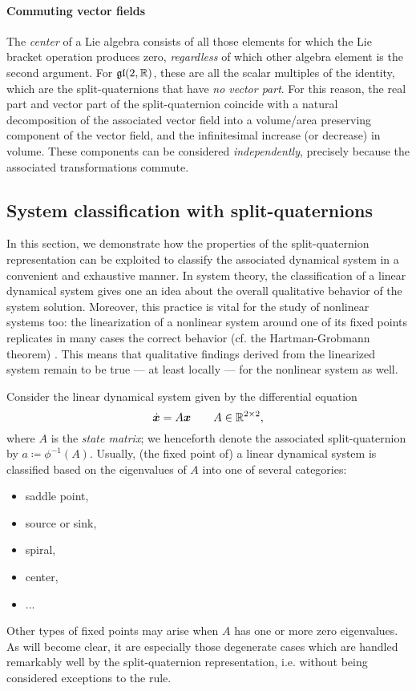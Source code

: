 \paragraph{Commuting vector fields}
The \emph{center} of a Lie algebra consists of all those elements for which the Lie bracket operation produces zero, \emph{regardless} of which other algebra element is the second argument. For $\mathfrak{gl}(2, \mathbb{R})$, these are all the scalar multiples of the identity, which are the split-quaternions that have \emph{no vector part}. For this reason, the real part and vector part of the split-quaternion coincide with a natural decomposition of the associated vector field into a volume/area preserving component of the vector field, and the infinitesimal increase (or decrease) in volume. These components can be considered \emph{independently}, precisely because the associated transformations commute.

\subsection{System classification with split-quaternions}
\label{ssec:system_classification}
In this section, we demonstrate how the properties of the split-quaternion representation can be exploited to classify the associated dynamical system in a convenient and exhaustive manner. In system theory, the classification of a linear dynamical system gives one an idea about the overall qualitative behavior of the system solution. Moreover, this practice is vital for the study of nonlinear systems too: the linearization of a nonlinear system around one of its fixed points replicates in many cases the correct behavior (cf. the Hartman-Grobmann theorem) \cite{Khalil2015}. This means that qualitative findings derived from the linearized system remain to be true --- at least locally --- for the nonlinear system as well.

Consider the linear dynamical system given by the differential equation
\begin{equation}
    \dot{\vec{x}} = A\vec{x} \qquad A \in \real^{2\times 2},
    \label{eq:dynamical_system}
\end{equation}
where $A$ is the \emph{state matrix}; we henceforth denote the associated split-quaternion by $a \coloneq \phi^{-1}(A)$. Usually, (the fixed point of) a linear dynamical system is classified based on the eigenvalues of $A$ into one of several categories:
\begin{itemize}[nosep,label=-]
    \item saddle point,
    \item source or sink,
    \item spiral,
    \item center,
    \item ...
\end{itemize}
Other types of fixed points may arise when $A$ has one or more zero eigenvalues. As will become clear, it are especially those degenerate cases which are handled remarkably well by the split-quaternion representation, i.e. without being considered exceptions to the rule.

